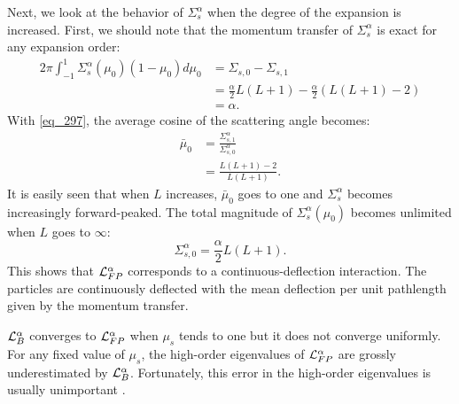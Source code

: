 Next, we look at the behavior of $\Sigma_s^{\alpha}$ when the degree of the expansion 
is increased. First, we should note that the momentum transfer of
$\Sigma_s^{\alpha}$ is exact for any expansion order:
\begin{equation}
\begin{split}
2\pi \int_{-1}^1 \Sigma_s^{\alpha}(\mu_0) (1-\mu_0) d\mu_0 &=
\Sigma_{s,0}-\Sigma_{s,1}\\
&=\frac{\alpha}{2} L(L+1) - \frac{\alpha}{2} (L(L+1)-2)\\
&=\alpha.
\end{split}
\end{equation}
With \cref{eq_297}, the average cosine of the scattering angle
becomes:
\begin{equation}
\begin{split}
\bar{\mu}_0 &= \frac{\Sigma_{s,1}^{\alpha}}{\Sigma_{s,0}^{\alpha}}\\
&=\frac{L(L+1)-2}{L(L+1)}.
\end{split}
\end{equation}
It is easily seen that when $L$ increases, $\bar{\mu}_0$ goes to one and
$\Sigma_s^{\alpha}$ becomes increasingly forward-peaked. The
total magnitude of $\Sigma_s^{\alpha}(\mu_0)$ becomes unlimited when $L$ goes to
$\infty$:
\begin{equation}
\Sigma_{s,0}^{\alpha} = \frac{\alpha}{2} L (L+1).
\end{equation}
This shows that $\mathcal{L}_{FP}^{\alpha}$ corresponds to a continuous-deflection 
interaction. The particles are continuously 
deflected with the mean deflection per unit pathlength given by the momentum transfer.

$\mathcal{L}_{B}^{\alpha}$ converges to $\mathcal{L}_{FP}^{\alpha}$ when $\mu_s$ tends
to one but it does not converge uniformly. For any fixed value of $\mu_s$, 
the high-order eigenvalues of $\mathcal{L}_{FP}^{\alpha}$ are grossly underestimated 
by $\mathcal{L}_B^{\alpha}$. Fortunately, this error in the high-order eigenvalues 
is usually unimportant \cite{morel_96}.
